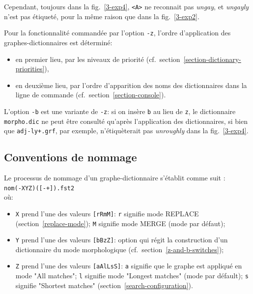 Cependant, toujours dans la fig.~\ref{3-exp4}, \verb+<A>+ ne reconnait pas \textit{ungay}, et
\textit{ungayly} n'est pas étiqueté, pour la même raison que dans la fig.~\ref{3-exp2}.

Pour la fonctionnalité commandée par l'option \verb+-z+, l'ordre d'application des graphes-dictionnaires est déterminé:
\begin{itemize}
\item
en premier lieu, par les niveaux de priorité (cf.~section~\ref{section-dictionary-priorities}),
\item
en deuxième lieu, par l'ordre d'apparition des noms des dictionnaires dans la ligne de commande
(cf.~section~\ref{section-console}).
\end{itemize}
L'option \verb+-b+ est une variante de \verb+-z+: si on insère \verb+b+ au lieu de \verb+z+, le
dictionnaire \verb+morpho.dic+ ne peut être consulté qu'après l'application des dictionnaires, si
bien que \verb!adj-ly+.grf!, par exemple, n'étiquèterait pas \textit{unroughly} dans la fig.~\ref{3-exp4}.

\subsection{Conventions de nommage}
\label{naming-conventions}
Le processus de nommage d'un graphe-dic\-tion\-naire s'établit comme suit :\\

\verb$nom(-XYZ)([-+]).fst2$\\

\noindent où:
\begin{itemize}
\item \verb+X+ prend l'une des valeurs \verb+[rRmM]+: \verb+r+ signifie mode REPLACE
(section~\ref{replace-mode});  \verb+M+ signifie mode MERGE (mode par défaut);
\item \verb+Y+ prend l'une des valeurs \verb+[bBzZ]+: option qui régit la construction d'un
dictionnaire du mode morphologique (cf.~section~\ref{z-and-b-switches});
\item \verb+Z+ prend l'une des valeurs \verb+[aAlLsS]+: \verb+a+ signifie que le graphe est
appliqué en mode "All matches"; \verb+l+ signifie mode "Longest matches" (mode par défault); 
\verb+s+ signifie "Short\-est matches" (section~\ref{search-configuration}).
\end{itemize}

